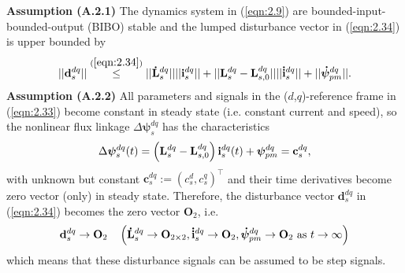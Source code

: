 \textbf{Assumption (A.2.1)} The dynamics system in (\ref{eqn:2.9}) are bounded-input-bounded-output (BIBO) stable and the lumped disturbance vector in (\ref{eqn:2.34}) is upper bounded by
\begin{equation}\notag
   ||\mathbf{d}^{dq}_s|| \stackrel{(\ref{eqn:2.34})}\leq  ||\mathbf{\dot L}^{dq}_{s}|| ||\mathbf{i}^{dq}_s|| +  ||\mathbf{L}^{dq}_{s} - \mathbf{L}^{dq}_{s,0}||  ||\mathbf{\dot i}^{dq}_s|| + ||\boldsymbol{\dot \psi}^{dq}_{pm}||.
\end{equation}
\textbf{Assumption (A.2.2)}
All parameters and signals in the ($d$,$q$)-reference frame in (\ref{eqn:2.33}) become constant in steady state (i.e. constant current and speed), so the nonlinear flux linkage $\Delta\boldsymbol{\psi}^{dq}_s$ has the characteristics
\begin{equation}\notag
    \Delta\boldsymbol{\psi}^{dq}_s(t) = \left( \mathbf{L}^{dq}_{s} - \mathbf{L}^{dq}_{s,0} \right) \mathbf{i}^{dq}_s(t) + \boldsymbol{\psi}^{dq}_{pm} = \mathbf{c}^{dq}_s,
\end{equation}
with unknown but constant $\mathbf{c}^{dq}_s:=(c^{d}_s,c^{q}_s)^\top$ and their time derivatives become zero vector (only) in steady state. Therefore, the disturbance vector $\mathbf{d}^{dq}_s $ in (\ref{eqn:2.34}) becomes the zero vector \(\mathbf{O}_2\), i.e. 
\begin{align}\notag
    \mathbf{d}^{dq}_s \rightarrow \mathbf{O}_2 \quad \left(
    \mathbf{\dot L}^{dq}_{s}\rightarrow \mathbf{O}_{2\times2}, \mathbf{\dot i}^{dq}_s \rightarrow \mathbf{O}_2, \boldsymbol{\dot \psi}^{dq}_{pm} \rightarrow \mathbf{O}_2 \text{ as } t \rightarrow \infty 
    \right)
\end{align}
which means that these disturbance signals can be assumed to be step signals.

